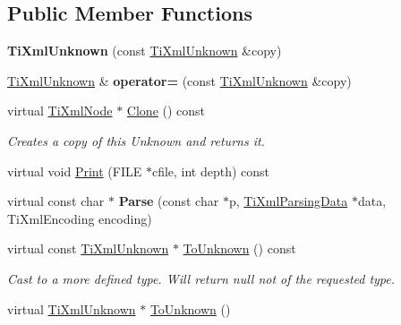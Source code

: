 \subsection*{Public Member Functions}
\begin{DoxyCompactItemize}
\item 
{\bfseries Ti\+Xml\+Unknown} (const \hyperlink{classTiXmlUnknown}{Ti\+Xml\+Unknown} \&copy)\hypertarget{classTiXmlUnknown_abe798ff4feea31474850c7f0de6bdf5e}{}\label{classTiXmlUnknown_abe798ff4feea31474850c7f0de6bdf5e}

\item 
\hyperlink{classTiXmlUnknown}{Ti\+Xml\+Unknown} \& {\bfseries operator=} (const \hyperlink{classTiXmlUnknown}{Ti\+Xml\+Unknown} \&copy)\hypertarget{classTiXmlUnknown_a60560b5aacb4bdc8b2b5f02f0a99c5c0}{}\label{classTiXmlUnknown_a60560b5aacb4bdc8b2b5f02f0a99c5c0}

\item 
virtual \hyperlink{classTiXmlNode}{Ti\+Xml\+Node} $\ast$ \hyperlink{classTiXmlUnknown_a675c4b2684af35e4c7649b7fd5ae598d}{Clone} () const \hypertarget{classTiXmlUnknown_a675c4b2684af35e4c7649b7fd5ae598d}{}\label{classTiXmlUnknown_a675c4b2684af35e4c7649b7fd5ae598d}

\begin{DoxyCompactList}\small\item\em Creates a copy of this Unknown and returns it. \end{DoxyCompactList}\item 
virtual void \hyperlink{classTiXmlUnknown_a025f19c21ef01ea9be50febb8fe0ba06}{Print} (F\+I\+LE $\ast$cfile, int depth) const 
\item 
virtual const char $\ast$ {\bfseries Parse} (const char $\ast$p, \hyperlink{classTiXmlParsingData}{Ti\+Xml\+Parsing\+Data} $\ast$data, Ti\+Xml\+Encoding encoding)\hypertarget{classTiXmlUnknown_aa51c2694e4177b5f0b5429ee5a81b58d}{}\label{classTiXmlUnknown_aa51c2694e4177b5f0b5429ee5a81b58d}

\item 
virtual const \hyperlink{classTiXmlUnknown}{Ti\+Xml\+Unknown} $\ast$ \hyperlink{classTiXmlUnknown_ab0313e5fe77987d746ac1a97a254419d}{To\+Unknown} () const \hypertarget{classTiXmlUnknown_ab0313e5fe77987d746ac1a97a254419d}{}\label{classTiXmlUnknown_ab0313e5fe77987d746ac1a97a254419d}

\begin{DoxyCompactList}\small\item\em Cast to a more defined type. Will return null not of the requested type. \end{DoxyCompactList}\item 
virtual \hyperlink{classTiXmlUnknown}{Ti\+Xml\+Unknown} $\ast$ \hyperlink{classTiXmlUnknown_a67c9fd22940e8c47f706a72cdd2e332c}{To\+Unknown} ()\hypertarget{classTiXmlUnknown_a67c9fd22940e8c47f706a72cdd2e332c}{}\label{classTiXmlUnknown_a67c9fd22940e8c47f706a72cdd2e332c}


\end{DoxyCompactItemize}
